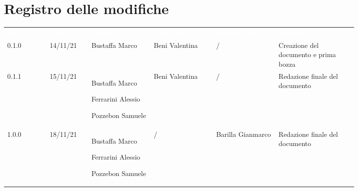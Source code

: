 \section*{Registro delle modifiche}

{\renewcommand{\arraystretch}{1.5}

\scriptsize
\begin{tabular}{p{0.10\linewidth}p{0.10\linewidth}p{0.15\linewidth}p{0.15\linewidth}p{0.15\linewidth}p{0.19\linewidth}}
	\rowcolor[RGB]{33, 73, 50}
	\textcolor{white}{\textbf{Versione}} & \textcolor{white}{\textbf{Data}} & \textcolor{white}
	{\textbf{Redattore}} & \textcolor{white}{\textbf{Verificatore}} & \textcolor{white}{\textbf{Approvatore}} & \textcolor{white}
	{\textbf{Descrizione}}\\
	\rowcolor[RGB]{216, 235, 171}
		0.1.0 & 14/11/21 & Bustaffa Marco & Beni Valentina &/& Creazione del documento e prima bozza\\
	\rowcolor[RGB]{233, 245, 206}
	0.1.1 & 15/11/21 & Bustaffa Marco \par  Ferrarini Alessio  \par Pozzebon Samuele & Beni Valentina&/& Redazione finale del documento\\
	\rowcolor[RGB]{216, 235, 171}
	1.0.0 & 18/11/21 & Bustaffa Marco \par  Ferrarini Alessio  \par Pozzebon Samuele &/&Barilla Gianmarco& Redazione finale del documento\\
\end{tabular}
}